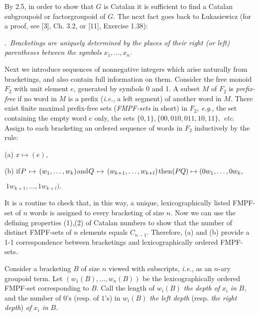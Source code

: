 \documentclass[a4paper,reqno]{amsart}\usepackage{amssymb,latexsym}
\theoremstyle{definition}
\theoremstyle{remark}
\numberwithin{equation}{section}
\numberwithin{theorem}{section}
\begin{document}
\smallskip

By 2.5, in order to show that $G$ is Catalan it is sufficient to find a
Catalan subgroupoid or factorgroupoid of $G$. The next fact goes back to
\L ukasiewicz (for a proof, see [3], Ch. 3.2, or [11], Exercise 1.38):

\bigskip

.\textit{\ Bracketings are uniquely determined by the places of
their right (or left) parentheses between the symbols }$x_{1},\ldots,x_{n}$\textit{.}

\smallskip

Next we introduce sequences of nonnegative integers which arise naturally from
bracketings, and also contain full information on them. Consider the free
monoid $F_{2}$ with unit element $e$, generated by symbols 0 and 1. A subset
$M$ of $F_{2}$ is \textit{prefix-free} if no word in $M$ is a prefix
(\textit{i.e.}, a left segment) of another word in $M$. There exist finite
maximal prefix-free sets (\textit{FMPF-sets} in short) in $F_{2}$,
\textit{e.g.}, the set containing the empty word $e$ only, the sets
$\{0,1\},\{00,010,011,10,11\},$ \textit{etc}. Assign to each bracketing an
ordered sequence of words in $F_{2}$ inductively by the rule:

\smallskip

\noindent(a) $x\mapsto(e)$,

\noindent(b) if$\hfill P\,\mapsto\,(w_{1},\ldots,w_{k})\hfill$and$\hfill
Q\,\mapsto\,(w_{k+1},\ldots,w_{k+l})\hfill$then$\hfill(PQ)\mapsto
(0w_{1},\ldots,0w_{k},$

$~1w_{k+1},\ldots,1w_{k+l}).$

\smallskip

It is a routine to check that, in this way, a unique, lexicographically listed
FMPF-set of $n$ words is assigned to every bracketing of size $n$. Now we can
use the defining properties (1),(2) of Catalan numbers to show that the number
of distinct FMPF-sets of $n$ elements equals $C_{n-1}$. Therefore, (a) and (b)
provide a 1-1 correspondence between bracketings and lexicographically ordered FMPF-sets.

\pagebreak

Consider a bracketing $B$ of size $n$ viewed with subscripts, \textit{i.e.},
as an $n$-ary groupoid term. Let $({w_{1}}(B),\ldots,{w_{n}}(B))$ be the
lexicographically ordered FMPF-set corresponding to $B$. Call the length of
${w_{i}}(B)$ \textit{the depth of} $x_{i}$ \textit{in} $B$, and the number of
$0$'s (resp. of $1$'s) in ${w_{i}}(B)$ \textit{the left depth} (resp.
\textit{the right depth}) \textit{of} $x_{i}$ \textit{in} $B$.
\end{document}
